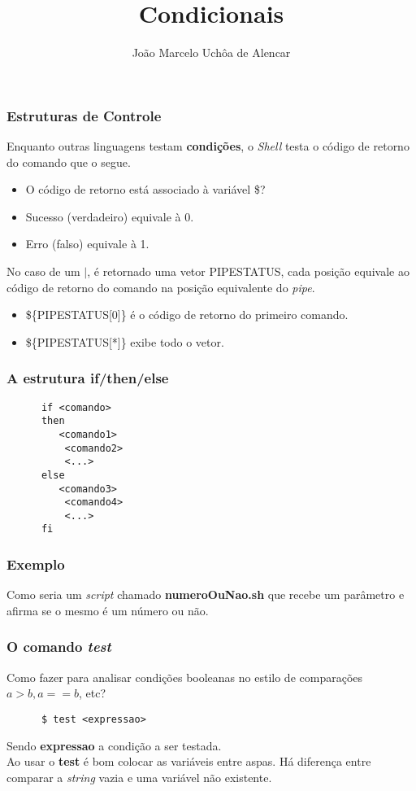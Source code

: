 \documentclass{beamer}
\title{Condicionais}
\author[João Marcelo Uchôa de Alencar]{João Marcelo Uchôa de Alencar}
\institute{Universidade Federal do Ceará - Quixadá}
\begin{document}
   \begin{frame}
      \titlepage
   \end{frame}

   \begin{frame}
      \frametitle{Estruturas de Controle}
      Enquanto outras linguagens testam \textbf{condições}, o \textit{Shell} testa o código de retorno do comando que o segue. \\
      \begin{itemize}
         \item O código de retorno está associado à variável \$?
	      \item Sucesso (verdadeiro) equivale à 0.
	      \item Erro (falso) equivale à 1.
      \end{itemize}
      No caso de um $|$, é retornado uma vetor PIPESTATUS, cada posição equivale ao código de retorno do comando na posição equivalente do \textit{pipe}.
      \begin{itemize}
         \item \$\{PIPESTATUS[0]\} é o código de retorno do primeiro comando.
	      \item \$\{PIPESTATUS[*]\} exibe todo o vetor.
      \end{itemize}
   \end{frame}

   \begin{frame}[fragile]
      \frametitle{A estrutura if\slash then\slash else}
      \begin{verbatim}
      if <comando>
      then
         <comando1>
	      <comando2>
	      <...>
      else
         <comando3>
	      <comando4>
	      <...>
      fi
      \end{verbatim}
\end{frame}

   \begin{frame}
      \frametitle{Exemplo}
      Como seria um \textit{script} chamado \textbf{numeroOuNao.sh} que recebe um parâmetro e afirma se o mesmo é um número ou não.
   \end{frame}

   \begin{frame}[fragile]
      \frametitle{O comando \textit{test}}
      Como fazer para analisar condições booleanas no estilo de comparações $a > b , a == b$, etc?
      \begin{verbatim}
      $ test <expressao>
      \end{verbatim}
      Sendo \textbf{expressao} a condição a ser testada. \\
      Ao usar o \textbf{test} é bom colocar as variáveis entre aspas. Há diferença entre comparar a \textit{string} vazia e uma variável não existente.
\end{frame}
\end{document}
